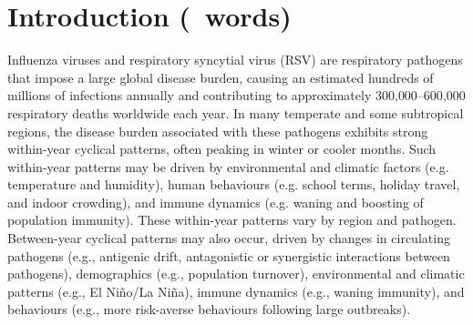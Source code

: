 
\section{Introduction (\introductionwordcount~words)}
Influenza viruses and respiratory syncytial virus (RSV) are respiratory pathogens that impose a large global disease burden, causing an estimated hundreds of millions of infections annually and contributing to approximately 300{,}000--600{,}000 respiratory deaths worldwide each year.
In many temperate and some subtropical regions, the disease burden associated with these pathogens exhibits strong within-year cyclical patterns, often peaking in winter or cooler months.
Such within-year patterns may be driven by environmental and climatic factors (e.g. temperature and humidity), human behaviours (e.g. school terms, holiday travel, and indoor crowding), and immune dynamics (e.g. waning and boosting of population immunity).
These within-year patterns vary by region and pathogen.
Between-year cyclical patterns may also occur, driven by changes in circulating pathogens (e.g., antigenic drift, antagonistic or synergistic interactions between pathogens), demographics (e.g., population turnover), environmental and climatic patterns (e.g., El Niño/La Niña), immune dynamics (e.g., waning immunity), and behaviours (e.g., more risk-averse behaviours following large outbreaks).

